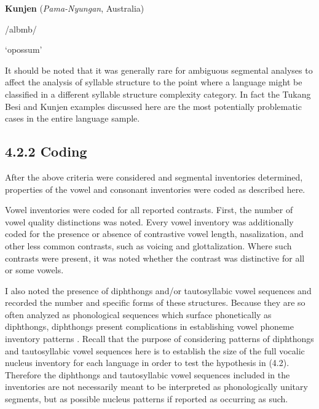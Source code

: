 \ea\label{ex:(4.8)}
   \textbf{Kunjen} (\textit{Pama-Nyungan}, Australia)



/albmb/



‘opossum’



\citep[33]{Sommer1969}

\z


  It should be noted that it was generally rare for ambiguous segmental analyses to affect the analysis of syllable structure to the point where a language might be classified in a different syllable structure complexity category. In fact the Tukang Besi and Kunjen examples discussed here are the most potentially problematic cases in the entire language sample.


\subsection{4.2.2 Coding}

  After the above criteria were considered and segmental inventories determined, properties of the vowel and consonant inventories were coded as described here.



  Vowel inventories were coded for all reported contrasts. First, the number of vowel quality distinctions was noted. Every vowel inventory was additionally coded for the presence or absence of contrastive vowel length, nasalization, and other less common contrasts, such as voicing and glottalization. Where such contrasts were present, it was noted whether the contrast was distinctive for all or some vowels. 



  I also noted the presence of diphthongs and/or tautosyllabic vowel sequences and recorded the number and specific forms of these structures. Because they are so often analyzed as phonological sequences which surface phonetically as diphthongs, diphthongs present complications in establishing vowel phoneme inventory patterns \citep[133]{Maddieson1984}. Recall that the purpose of considering patterns of diphthongs and tautosyllabic vowel sequences here is to establish the size of the full vocalic nucleus inventory for each language in order to test the hypothesis in (4.2). Therefore the diphthongs and tautosyllabic vowel sequences included in the inventories are not necessarily meant to be interpreted as phonologically unitary segments, but as possible nucleus patterns if reported as occurring as such.



